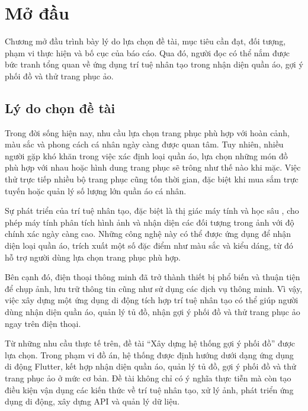 \chapter{Mở đầu}
\label{ch:modau}

\begin{muctieu}
Chương mở đầu trình bày lý do lựa chọn đề tài, mục tiêu cần đạt, đối tượng,
phạm vi thực hiện và bố cục của báo cáo. Qua đó, người đọc có thể nắm được
bức tranh tổng quan về ứng dụng trí tuệ nhân tạo trong nhận diện quần áo,
gợi ý phối đồ và thử trang phục ảo.
\end{muctieu}

\section{Lý do chọn đề tài}

Trong đời sống hiện nay, nhu cầu lựa chọn trang phục phù hợp với hoàn cảnh,
màu sắc và phong cách cá nhân ngày càng được quan tâm. Tuy nhiên, nhiều người
gặp khó khăn trong việc xác định loại quần áo, lựa chọn những món đồ phù hợp
với nhau hoặc hình dung trang phục sẽ trông như thế nào khi mặc. Việc thử
trực tiếp nhiều bộ trang phục cũng tốn thời gian, đặc biệt khi mua sắm trực
tuyến hoặc quản lý số lượng lớn quần áo cá nhân.

Sự phát triển của trí tuệ nhân tạo, đặc biệt là thị giác máy tính
 và học sâu , cho phép máy tính
phân tích hình ảnh và nhận diện các đối tượng trong ảnh với độ chính xác
ngày càng cao. Những công nghệ này có thể được ứng dụng để nhận diện loại
quần áo, trích xuất một số đặc điểm như màu sắc và kiểu dáng, từ đó hỗ trợ
người dùng lựa chọn trang phục phù hợp.

Bên cạnh đó, điện thoại thông minh đã trở thành thiết bị phổ biến và thuận
tiện để chụp ảnh, lưu trữ thông tin cũng như sử dụng các dịch vụ thông minh.
Vì vậy, việc xây dựng một ứng dụng di động tích hợp trí tuệ nhân tạo có thể
giúp người dùng nhận diện quần áo, quản lý tủ đồ, nhận gợi ý phối đồ và thử
trang phục ảo ngay trên điện thoại.

Từ những nhu cầu thực tế trên, đề tài ``Xây dựng hệ thống gợi ý phối đồ''
được lựa chọn. Trong phạm vi đồ án, hệ thống được định hướng dưới dạng ứng
dụng di động Flutter, kết hợp nhận diện quần áo, quản lý tủ đồ, gợi ý phối
đồ và thử trang phục ảo ở mức cơ bản. Đề tài không chỉ có ý nghĩa thực tiễn
mà còn tạo điều kiện vận dụng các kiến thức về trí tuệ nhân tạo, xử lý ảnh,
phát triển ứng dụng di động, xây dựng API và quản lý dữ liệu.

